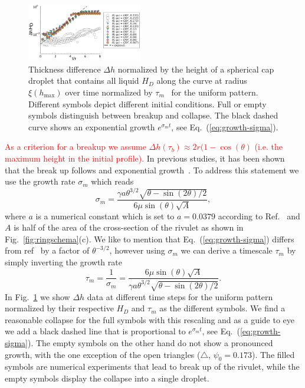 \documentclass[twoside,twocolumn,9pt]{article}
\begin{document}
\begin{figure}
    \centering
    \includegraphics[width=0.45\textwidth]{assets/growth-breakup.pdf}
    \caption{Thickness difference $\Delta h$ normalized by the height of a spherical cap droplet that contains all liquid $H_D$ along the curve at radius $\xi(h_{\max})$ over time normalized by $\tau_{m}$~\cite{wuBreakupPatternedNanoscale2010} for the uniform pattern. 
    Different symbols depict different initial conditions. 
    Full or empty symbols distinguish between breakup and collapse. 
    The black dashed curve shows an exponential growth $e^{\sigma_m t}$, see Eq.~(\ref{eq:growth-sigma}).
    }
    \label{fig:first_growth}
\end{figure}
\textcolor{red}{As a criterion for a breakup we assume $\Delta h(\tau_b) \approx 2r(1-\cos(\theta)$ (i.e. the maximum height in the initial profile).}
In previous studies, it has been shown that the break up follows and exponential growth~\cite{wuBreakupPatternedNanoscale2010, gonzalezStabilityLiquidRing2013, nguyenCompetitionCollapseBreakup2012}.
To address this statement we use the growth rate $\sigma_m$ which reads
\begin{equation}\label{eq:growth-sigma}
    \sigma_m = \frac{\gamma a \theta^{3/2}\sqrt{\theta - \sin(2\theta)/2}}{6\mu\sin(\theta)\sqrt{A}}, 
\end{equation}
where $a$ is a numerical constant which is set to $a = 0.0379$ according to Ref.~\cite{wuBreakupPatternedNanoscale2010, diezBreakupFluidRivulets2009} and $A$ is half of the area of the cross-section of the rivulet as shown in Fig.~\ref{fig:ringschema}(c).
We like to mention that Eq.~(\ref{eq:growth-sigma}) differs from ref~\cite{wuBreakupPatternedNanoscale2010} by a factor of $\theta^{-3/2}$, however using $\sigma_m$ we can derive a timescale $\tau_m$ by simply inverting the growth rate  
\begin{equation}\label{eq:tau_m}
    \tau_{m} = \frac{1}{\sigma_m} = \frac{6\mu\sin(\theta)\sqrt{A}}{\gamma a \theta^{3/2}\sqrt{\theta - \sin(2\theta)/2}}.      
\end{equation}
In Fig.~\ref{fig:first_growth} we show $\Delta h$ data at different time steps for the uniform pattern normalized by their respective $H_D$ and $\tau_m$ as the different symbols.  
We find a reasonable collapse for the full symbols with this rescaling and as a guide to eye we add a black dashed line that is proportional to $e^{\sigma_m t}$, see Eq.~(\ref{eq:growth-sigma}). 
The empty symbols on the other hand do not show a pronounced growth, with the one exception of the open triangles ($\triangle$, $\psi_0 = 0.173$). 
The filled symbols are numerical experiments that lead to break up of the rivulet, while the empty symbols display the collapse into a single droplet.
\end{document}
